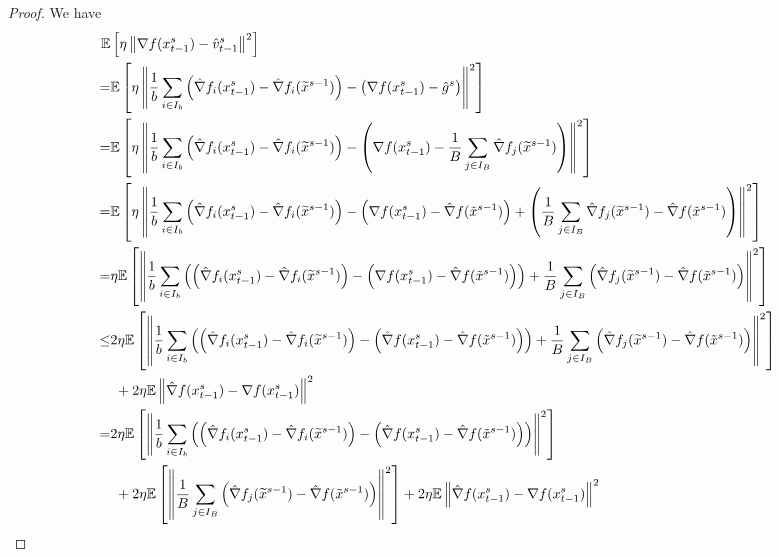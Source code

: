\documentclass{article}
\newcommand*{\E}{\mathbb{E}}
\newcommand{\norm}[1]{\left\lVert#1\right\rVert}
\theoremstyle{definition}
\theoremstyle{remark}
\begin{document}
\begin{proof}
We have
\begin{align}
  \E&\left[\eta\norm{\nabla f(x_{t-1}^s)-{\hat{v}_{t-1}^s}}^2\right]\notag\\
   =&\E\left[\eta\norm{\frac{1}{b}\sum_{i\in I_b}\left(\hat{\nabla} f_i(x_{t-1}^s)-\hat{\nabla} f_i(\widetilde{x}^{s-1})\right) - \left(\nabla f(x_{t-1}^s)-\hat{g}^s\right)}^2\right]\notag\\
   =&\E\left[\eta\norm{\frac{1}{b}\sum_{i\in I_b}\left(\hat{\nabla} f_i(x_{t-1}^s)-\hat{\nabla} f_i(\widetilde{x}^{s-1})\right) - \left(\nabla f(x_{t-1}^s)-\frac{1}{B}\sum_{j\in I_B}\hat{\nabla} f_j(\widetilde{x}^{s-1})\right)}^2\right]\notag\\
   =&\notag\E\left[\eta\norm{\frac{1}{b}\sum_{i\in I_b}\left(\hat{\nabla} f_i(x_{t-1}^s)-\hat{\nabla} f_i(\widetilde{x}^{s-1})\right) - \left(\nabla f(x_{t-1}^s) - \hat{\nabla} f(\tilde{x}^{s-1}) \right)+ \left(\frac{1}{B}\sum_{j\in I_B}\hat{\nabla} f_j(\widetilde{x}^{s-1}) - \hat{\nabla} f(\tilde{x}^{s-1})\right)}^2\right]\\
   =&\notag\eta\E\left[\norm{\frac{1}{b}\sum_{i\in I_b}\left(\left(\hat{\nabla} f_i(x_{t-1}^s)-\hat{\nabla} f_i(\widetilde{x}^{s-1})\right) - \left(\nabla f(x_{t-1}^s) - \hat{\nabla} f(\tilde{x}^{s-1}) \right)\right)+ \frac{1}{B}\sum_{j\in I_B}\left(\hat{\nabla} f_j(\widetilde{x}^{s-1}) - \hat{\nabla} f(\tilde{x}^{s-1})\right)}^2\right]\\
   \leq &\notag2\eta\E\left[\norm{\frac{1}{b}\sum_{i\in I_b}\left(\left(\hat{\nabla} f_i(x_{t-1}^s)-\hat{\nabla} f_i(\widetilde{x}^{s-1})\right) - \left(\hat{\nabla} f(x_{t-1}^s) - \hat{\nabla} f(\tilde{x}^{s-1}) \right)\right)+ \frac{1}{B}\sum_{j\in I_B}\left(\hat{\nabla} f_j(\widetilde{x}^{s-1}) - \hat{\nabla} f(\tilde{x}^{s-1})\right)}^2\right]\\
   &\,\, + 2\eta \E \norm{\hat{\nabla} f(x_{t-1}^s)-\nabla f(x_{t-1}^s)}^2\label{var-estimate-lem-1}\\
    = &\notag 2 \eta\E\left[\norm{\frac{1}{b}\sum_{i\in I_b}\left(\left(\hat{\nabla} f_i(x_{t-1}^s)-\hat{\nabla} f_i(\widetilde{x}^{s-1})\right) - \left(\hat{\nabla} f(x_{t-1}^s) - \hat{\nabla} f(\tilde{x}^{s-1}) \right)\right)}^2\right]\\
   &\,\, +2 \eta \E \left[ \norm{\frac{1}{B}\sum_{j\in I_B}\left(\hat{\nabla} f_j(\widetilde{x}^{s-1}) - \hat{\nabla} f(\tilde{x}^{s-1})\right)}^2\right]+ 2\eta \E \norm{\hat{\nabla} f(x_{t-1}^s)-\nabla f(x_{t-1}^s)}^2\label{var-estimate-lem-2}\\

\end{align}
\end{proof}
\end{document}
